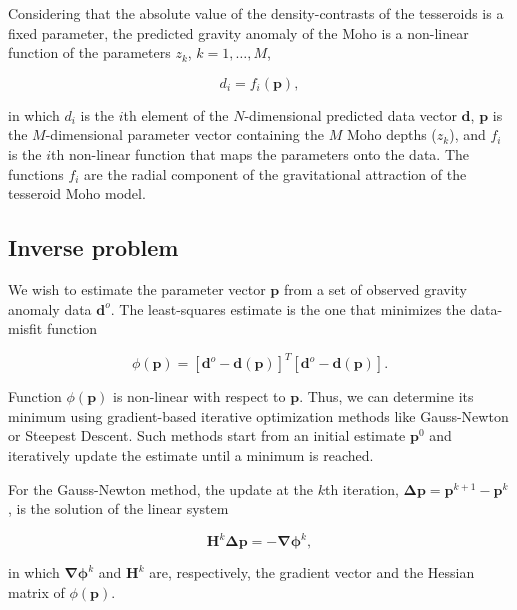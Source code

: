 Considering that the absolute value of the density-contrasts
of the tesseroids is a fixed parameter,
the predicted gravity anomaly of the Moho is a non-linear function of the
parameters $z_k$, $k=1, \ldots, M$,

\begin{equation}
    d_i = f_i(\mathbf{p}),
    \label{eq:p3-forward}
\end{equation}

\noindent in which $d_i$ is the $i$th element of the $N$-dimensional predicted
data vector $\mathbf{d}$, $\mathbf{p}$ is the $M$-dimensional parameter vector
containing the $M$ Moho depths ($z_k$),
and $f_i$ is the $i$th non-linear function that maps the parameters onto the
data.
The functions $f_i$ are the radial component of the gravitational attraction
of the tesseroid Moho model.



\subsection{Inverse problem}

We wish to estimate the parameter vector $\mathbf{p}$ from a set of observed
gravity anomaly data $\mathbf{d}^o$.
The least-squares estimate is the one that minimizes the data-misfit function

\begin{equation}
    \phi(\mathbf{p}) =
    [\mathbf{d}^o - \mathbf{d}(\mathbf{p})]^T[\mathbf{d}^o - \mathbf{d}(\mathbf{p})].
    \label{eq:p3-data-misfit}
\end{equation}

Function $\phi(\mathbf{p})$ is non-linear with respect to $\mathbf{p}$.
Thus, we can determine its minimum using gradient-based
iterative optimization
methods like Gauss-Newton or Steepest Descent.
Such methods start from an initial estimate $\mathbf{p}^0$ and iteratively
update the estimate until a minimum is reached.

For the Gauss-Newton method,
the update at the $k$th iteration,
$\mathbf{\Delta p} = \mathbf{p}^{k+1} - \mathbf{p}^k$,
is the solution of the linear system

\begin{equation}
    \mathbf{H}^k\mathbf{\Delta p} = -\mathbf{\nabla\phi}^k,
    \label{eq:p3-gaussnewton}
\end{equation}

\noindent in which
$\mathbf{\nabla\phi}^k$ and $\mathbf{H}^k$ are, respectively,
the gradient vector and the Hessian matrix of $\phi(\mathbf{p})$.

